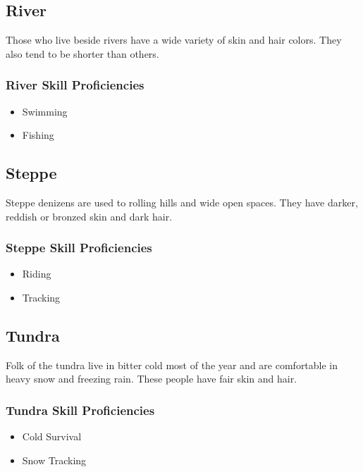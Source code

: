 \begin{multicols}{2}
\subsection{River}

Those who live beside rivers have a wide variety of skin and hair colors.
They also tend to be shorter than others.

\subsubsection{River Skill Proficiencies}

\begin{itemize}
  \item Swimming
  \item Fishing
\end{itemize}

\subsection{Steppe}

Steppe denizens are used to rolling hills and wide open spaces. They have
darker, reddish or bronzed skin and dark hair.

\subsubsection{Steppe Skill Proficiencies}

\begin{itemize}
  \item Riding
  \item Tracking
\end{itemize}

\subsection{Tundra}

Folk of the tundra live in bitter cold most of the year and are comfortable
in heavy snow and freezing rain. These people have fair skin and hair.

\subsubsection{Tundra Skill Proficiencies}

\begin{itemize}
  \item Cold Survival
  \item Snow Tracking
\end{itemize}

\end{multicols}
